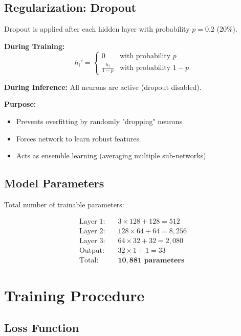 \documentclass[12pt,a4paper]{article}
\begin{document}
\subsection{Regularization: Dropout}

Dropout is applied after each hidden layer with probability $p = 0.2$ (20\%).

\textbf{During Training:}
\begin{equation}
    h_i' = \begin{cases}
        0 & \text{with probability } p \\
        \frac{h_i}{1-p} & \text{with probability } 1-p
    \end{cases}
\end{equation}

\textbf{During Inference:} All neurons are active (dropout disabled).

\textbf{Purpose:}
\begin{itemize}
    \item Prevents overfitting by randomly "dropping" neurons
    \item Forces network to learn robust features
    \item Acts as ensemble learning (averaging multiple sub-networks)
\end{itemize}

\subsection{Model Parameters}

Total number of trainable parameters:

\begin{align}
    \text{Layer 1:} & \quad 3 \times 128 + 128 = 512 \\
    \text{Layer 2:} & \quad 128 \times 64 + 64 = 8,256 \\
    \text{Layer 3:} & \quad 64 \times 32 + 32 = 2,080 \\
    \text{Output:} & \quad 32 \times 1 + 1 = 33 \\
    \hline
    \text{Total:} & \quad \mathbf{10,881 \text{ parameters}}
\end{align}

\section{Training Procedure}

\subsection{Loss Function}
\end{document}
